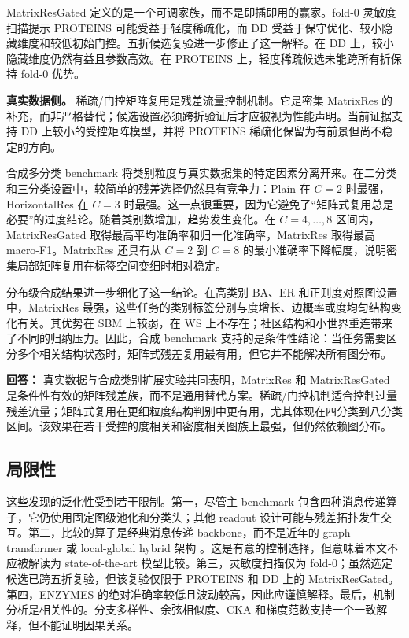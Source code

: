 \documentclass[UTF8,10pt]{ctexart}
\let\cite\citep
\begin{document}
MatrixResGated 定义的是一个可调家族，而不是即插即用的赢家。fold-0 灵敏度扫描提示 PROTEINS 可能受益于轻度稀疏化，而 DD 受益于保守优化、较小隐藏维度和较低初始门控。五折候选复验进一步修正了这一解释。在 DD 上，较小隐藏维度仍然有益且参数高效。在 PROTEINS 上，轻度稀疏候选未能跨所有折保持 fold-0 优势。

\textbf{真实数据侧。} 稀疏/门控矩阵复用是残差流量控制机制。它是密集 MatrixRes 的补充，而非严格替代；候选设置必须跨折验证后才应被视为性能声明。当前证据支持 DD 上较小的受控矩阵模型，并将 PROTEINS 稀疏化保留为有前景但尚不稳定的方向。

合成多分类 benchmark 将类别粒度与真实数据集的特定因素分离开来。在二分类和三分类设置中，较简单的残差选择仍然具有竞争力：Plain 在 \(C=2\) 时最强，HorizontalRes 在 \(C=3\) 时最强。这一点很重要，因为它避免了“矩阵式复用总是必要”的过度结论。随着类别数增加，趋势发生变化。在 \(C=4,\ldots,8\) 区间内，MatrixResGated 取得最高平均准确率和归一化准确率，MatrixRes 取得最高 macro-F1。MatrixRes 还具有从 \(C=2\) 到 \(C=8\) 的最小准确率下降幅度，说明密集局部矩阵复用在标签空间变细时相对稳定。

分布级合成结果进一步细化了这一结论。在高类别 BA、ER 和正则度对照图设置中，MatrixRes 最强，这些任务的类别标签分别与度增长、边概率或度均匀结构变化有关。其优势在 SBM 上较弱，在 WS 上不存在；社区结构和小世界重连带来了不同的归纳压力。因此，合成 benchmark 支持的是条件性结论：当任务需要区分多个相关结构状态时，矩阵式残差复用最有用，但它并不能解决所有图分布。

\textbf{回答：} 真实数据与合成类别扩展实验共同表明，MatrixRes 和 MatrixResGated 是条件性有效的矩阵残差族，而不是通用替代方案。稀疏/门控机制适合控制过量残差流量；矩阵式复用在更细粒度结构判别中更有用，尤其体现在四分类到八分类区间。该效果在若干受控的度相关和密度相关图族上最强，但仍然依赖图分布。

\subsection{局限性}

这些发现的泛化性受到若干限制。第一，尽管主 benchmark 包含四种消息传递算子，它仍使用固定图级池化和分类头；其他 readout 设计可能与残差拓扑发生交互。第二，比较的算子是经典消息传递 backbone，而不是近年的 graph transformer 或 local-global hybrid 架构 \cite{dwivedi2020generalization}。这是有意的控制选择，但意味着本文不应被解读为 state-of-the-art 模型比较。第三，灵敏度扫描仅为 fold-0；虽然选定候选已跨五折复验，但该复验仅限于 PROTEINS 和 DD 上的 MatrixResGated。第四，ENZYMES 的绝对准确率较低且波动较高，因此应谨慎解释。最后，机制分析是相关性的。分支多样性、余弦相似度、CKA 和梯度范数支持一个一致解释，但不能证明因果关系。
\end{document}
